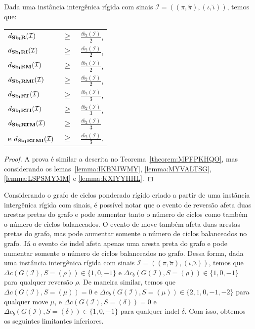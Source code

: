 \begin{theorem}\label{theorem:NFVKZGKW}
Dada uma instância intergênica rígida com sinais $\mathcal{I}=((\pi,\breve\pi),(\iota,\breve\iota))$, temos que:

\begin{tabular}{lll}
  $d_{\textbf{Sb\textsubscript{I}R}}(\mathcal{I})$      & $ \ge $ & $\frac{ib_2(\mathcal{I})}{2}$, \\ 
  $d_{\textbf{Sb\textsubscript{I}RI}}(\mathcal{I})$     & $ \ge $ & $\frac{ib_2(\mathcal{I})}{2}$, \\
  $d_{\textbf{Sb\textsubscript{I}RM}}(\mathcal{I})$     & $ \ge $ & $\frac{ib_2(\mathcal{I})}{2}$, \\
  $d_{\textbf{Sb\textsubscript{I}RMI}}(\mathcal{I})$    & $ \ge $ & $\frac{ib_2(\mathcal{I})}{2}$, \\
  $d_{\textbf{Sb\textsubscript{I}RT}}(\mathcal{I})$     & $ \ge $ & $\frac{ib_2(\mathcal{I})}{3}$, \\
  $d_{\textbf{Sb\textsubscript{I}RTI}}(\mathcal{I})$    & $ \ge $ & $\frac{ib_2(\mathcal{I})}{3}$, \\
  $d_{\textbf{Sb\textsubscript{I}RTM}}(\mathcal{I})$    & $ \ge $ & $\frac{ib_2(\mathcal{I})}{3}$  \\
  e $d_{\textbf{Sb\textsubscript{I}RTMI}}(\mathcal{I})$ & $ \ge $ & $\frac{ib_2(\mathcal{I})}{3}$. \\
\end{tabular}
\end{theorem}
\begin{proof}
A prova é similar a descrita no Teorema~\ref{theorem:MPFPKHQO}, mas considerando os lemas~\ref{lemma:IKBNJWMY}, \ref{lemma:MYVALTSG}, \ref{lemma:LSPSMYMM} e \ref{lemma:KXIYYHHL}.
\end{proof}

Considerando o grafo de ciclos ponderado rígido criado a partir de uma instância intergênica rígida com sinais, é possível notar que o evento de reversão afeta duas arestas pretas do grafo e pode aumentar tanto o número de ciclos como também o número de ciclos balanceados. O evento de move também afeta duas arestas pretas do grafo, mas pode aumentar somente o número de ciclos balanceados no grafo. Já o evento de indel afeta apenas uma aresta preta do grafo e pode aumentar somente o número de ciclos balanceados no grafo. Dessa forma, dada uma instância intergênica rígida com sinais $\mathcal{I} = ((\pi,\breve\pi),(\iota,\breve\iota))$, temos que $\Delta c(G(\mathcal{I}), S=(\rho)) \in \{1,0,-1\}$ e $\Delta c_b(G(\mathcal{I}), S=(\rho)) \in \{1,0,-1\}$ para qualquer reversão $\rho$. De maneira similar, temos que $\Delta c(G(\mathcal{I}), S=(\mu)) = 0$ e $\Delta c_b(G(\mathcal{I}), S=(\mu)) \in \{2,1,0,{-1},{-2}\}$ para qualquer move $\mu$, e $\Delta c(G(\mathcal{I}), S=(\delta)) = 0$ e $\Delta c_b(G(\mathcal{I}), S=(\delta)) \in \{1,0,{-1}\}$ para qualquer indel $\delta$. Com isso, obtemos os seguintes limitantes inferiores.

